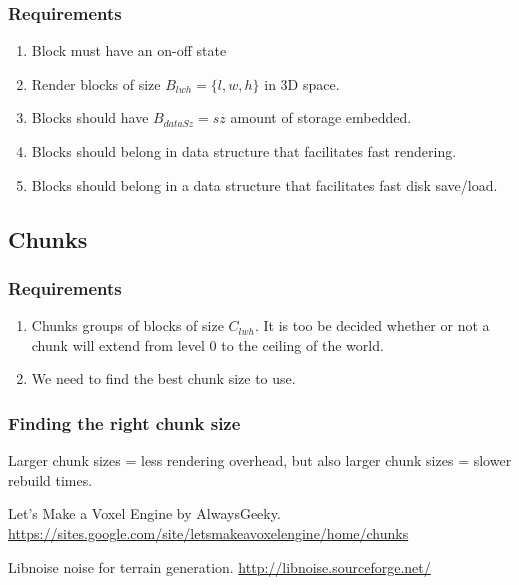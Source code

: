 \documentclass{article}
\newcommand{\blockWidth}{w}
\newcommand{\blockLength}{l}
\newcommand{\blockHeight}{h}
\newcommand{\blockDataSize}{sz}
\begin{document}
\subsubsection{Requirements}
\begin{enumerate}
\item
Block must have an on-off state
\item
Render blocks of size $B_{lwh} = \{\blockLength, \blockWidth, \blockHeight\}$ 
in 3D space.
\item
Blocks should have $B_{dataSz} = \blockDataSize$ amount of storage embedded.
\item
Blocks should belong in data structure that facilitates fast rendering.
\item
Blocks should belong in a data structure that facilitates fast disk save/load.
\end{enumerate}
\subsection{Chunks}
\label{def:chunk}
\subsubsection{Requirements}
\begin{enumerate}
\item
Chunks groups of blocks of size $C_{lwh}$. It is too be decided whether or not a 
chunk will extend from level 0 to the ceiling of the world.
\item
We need to find the best chunk size to use.
\end{enumerate}
\subsubsection{Finding the right chunk size}
Larger chunk sizes = less rendering overhead, but also larger chunk sizes = slower rebuild times\cite{voxpage}.

\begin{thebibliography}{9}

Let's Make a Voxel Engine by AlwaysGeeky.
\url{https://sites.google.com/site/letsmakeavoxelengine/home/chunks}

Libnoise noise for terrain generation.
\url{http://libnoise.sourceforge.net/}
\end{thebibliography}
\end{document}
